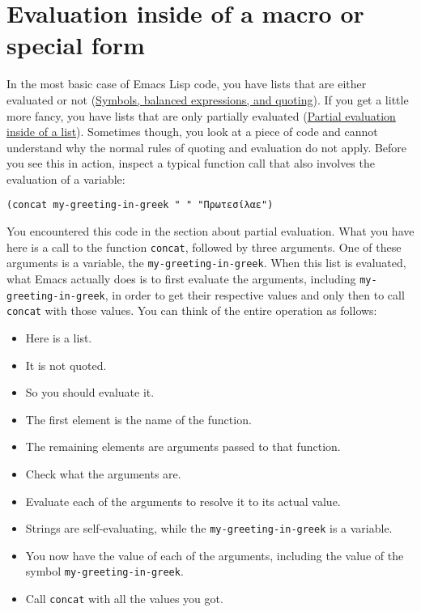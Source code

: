 \documentclass[11pt]{ctexart}
\begin{document}
\section{Evaluation inside of a macro or special form}
\label{sec:org61e1a1b}
In the most basic case of Emacs Lisp code, you have lists that are either evaluated or not (\hyperref[sec:org9b7817a]{Symbols, balanced expressions, and quoting}). If you get a little more fancy, you have lists that are only partially evaluated (\hyperref[sec:org771b57a]{Partial evaluation inside of a list}). Sometimes though, you look at a piece of code and cannot understand why the normal rules of quoting and evaluation do not apply. Before you see this in action, inspect a typical function call that also involves the evaluation of a variable:

\begin{verbatim}
(concat my-greeting-in-greek " " "Πρωτεσίλαε")
\end{verbatim}

You encountered this code in the section about partial evaluation. What you have here is a call to the function \texttt{concat}, followed by three arguments. One of these arguments is a variable, the \texttt{my-greeting-in-greek}. When this list is evaluated, what Emacs actually does is to first evaluate the arguments, including \texttt{my-greeting-in-greek}, in order to get their respective values and only then to call \texttt{concat} with those values. You can think of the entire operation as follows:

\begin{itemize}
\item Here is a list.
\item It is not quoted.
\item So you should evaluate it.
\item The first element is the name of the function.
\item The remaining elements are arguments passed to that function.
\item Check what the arguments are.
\item Evaluate each of the arguments to resolve it to its actual value.
\item Strings are self-evaluating, while the \texttt{my-greeting-in-greek} is a variable.
\item You now have the value of each of the arguments, including the value of the symbol \texttt{my-greeting-in-greek}.
\item Call \texttt{concat} with all the values you got.
\end{itemize}
\end{document}
